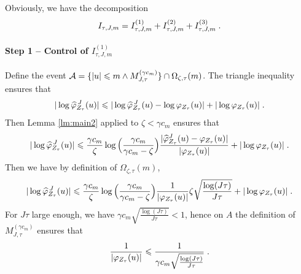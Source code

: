 Obviously, we have the decomposition 
	\begin{equation*}
	I_{\tau, J, m} = I_{\tau, J, m}^{(1)} + I_{\tau, J, m}^{(2)}  + I_{\tau, J, m}^{(3)} 
	\; .
	\end{equation*}
	
\paragraph{\textbf{Step 1} -- Control of $I_{\tau, J, m}^{(1)}$} Define the event $\mathcal{A} = \{ |u| \leqslant m \wedge M_{J, \tau}^{(\gamma c_m)} \}  \cap \Omega_{\zeta, \tau}(m)$. The triangle inequality ensures that
	\begin{equation*}
	| \log \widehat \varphi_{Z_\tau}^{\, J}(u) | \leqslant | \log \widehat \varphi_{Z_\tau}^{\, J}(u) - \log \varphi_{Z_\tau}(u) | + |\log \varphi_{Z_\tau}(u) |
	\; .
	\end{equation*}
Then Lemma \ref{lm:main2} applied to $\zeta < \gamma c_m$ ensures that
	\begin{equation*}
	| \log \widehat \varphi_{Z_\tau}^{\, J}(u) | \leqslant 
	        \frac{\gamma c_m}{\zeta} \log \Big( \frac{\gamma c_m}{\gamma c_m- \zeta}\Big)
        \frac{|\widehat \varphi_{Z_\tau}^J(u) - \varphi_{Z_\tau}(u)|}{|\varphi_{Z_\tau}(u)|} + |\log \varphi_{Z_\tau}(u) |
	\; .
	\end{equation*}
Then we have by definition of $\Omega_{\zeta, \tau}(m)$, 
		\begin{equation*}
	| \log \widehat \varphi_{Z_\tau}^{\, J}(u) | \leqslant 
	        \frac{\gamma c_m}{\zeta} \log \Big( \frac{\gamma c_m}{\gamma c_m- \zeta}\Big)
        \frac{1}{|\varphi_{Z_\tau}(u)|} \zeta \sqrt{\frac{\log(J\tau)}{J \tau}}+ |\log \varphi_{Z_\tau}(u) |
	\; .
	\end{equation*}
For $J\tau$ large enough, we have $\gamma c_m \sqrt{\frac{\log(J \tau)}{J \tau}} < 1$, hence on $A$
the definition of $M_{J, \tau}^{(\gamma c_m)}$ ensures that
	\begin{equation*}
	\frac{1}{|\varphi_{Z_\tau}(u)|} \leqslant \frac{1}{\gamma c_m \sqrt{\frac{\log(J\tau)}{J \tau}}}
	\; .
	\end{equation*}
	
